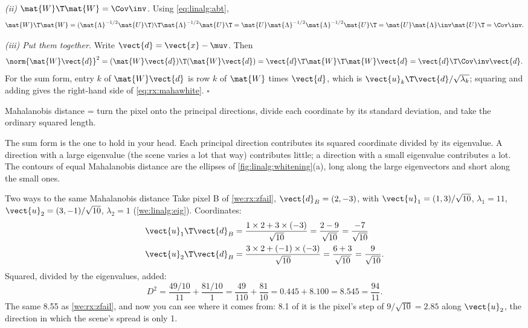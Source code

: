 \emph{(ii) $\mat{W}\T\mat{W} = \Cov\inv$.} Using \cref{eq:linalg:abt},
\[
\mat{W}\T\mat{W} = (\mat{\Lambda}^{-1/2}\mat{U}\T)\T\mat{\Lambda}^{-1/2}\mat{U}\T
= \mat{U}\mat{\Lambda}^{-1/2}\mat{\Lambda}^{-1/2}\mat{U}\T
= \mat{U}\mat{\Lambda}\inv\mat{U}\T = \Cov\inv .
\]

\emph{(iii) Put them together.} Write $\vect{d} = \vect{x} - \muv$. Then
\[
\norm{\mat{W}\vect{d}}^2 = (\mat{W}\vect{d})\T(\mat{W}\vect{d}) = \vect{d}\T\mat{W}\T\mat{W}\vect{d}
= \vect{d}\T\Cov\inv\vect{d}.
\]
For the sum form, entry $k$ of $\mat{W}\vect{d}$ is row $k$ of $\mat{W}$ times $\vect{d}$, which is
$\vect{u}_k\T\vect{d}/\sqrt{\lambda_k}$; squaring and adding gives the right-hand side of
\cref{eq:rx:mahawhite}. \hfill$\square$

\begin{keypoint}
Mahalanobis distance = turn the pixel onto the principal directions, divide each coordinate by its
standard deviation, and take the ordinary squared length.
\end{keypoint}

The sum form is the one to hold in your head. Each principal direction contributes its squared
coordinate divided by its eigenvalue. A direction with a large eigenvalue (the scene varies a lot
that way) contributes little; a direction with a small eigenvalue contributes a lot. The contours of
equal Mahalanobis distance are the ellipses of \cref{fig:linalg:whitening}(a), long along the large
eigenvectors and short along the small ones.

\begin{worked}[label={we:rx:twoways}]{Two ways to the same Mahalanobis distance}
Take pixel B of \cref{we:rx:zfail}, $\vect{d}_B = (2, -3)$, with $\vect{u}_1 = (1, 3)/\sqrt{10}$,
$\lambda_1 = 11$, $\vect{u}_2 = (3, -1)/\sqrt{10}$, $\lambda_2 = 1$ (\cref{we:linalg:eig}).
Coordinates:
\begin{align*}
\vect{u}_1\T\vect{d}_B &= \frac{1\times2 + 3\times(-3)}{\sqrt{10}} = \frac{2 - 9}{\sqrt{10}}
  = \frac{-7}{\sqrt{10}}\\
\vect{u}_2\T\vect{d}_B &= \frac{3\times2 + (-1)\times(-3)}{\sqrt{10}} = \frac{6 + 3}{\sqrt{10}}
  = \frac{9}{\sqrt{10}} .
\end{align*}
Squared, divided by the eigenvalues, added:
\[
D^2 = \frac{49/10}{11} + \frac{81/10}{1} = \frac{49}{110} + \frac{81}{10}
= 0.445 + 8.100 = 8.545 = \frac{94}{11}.
\]
The same 8.55 as \cref{we:rx:zfail}, and now you can see where it comes from: 8.1 of it is the
pixel's step of $9/\sqrt{10} = 2.85$ along $\vect{u}_2$, the direction in which the scene's spread is
only 1.
\end{worked}

